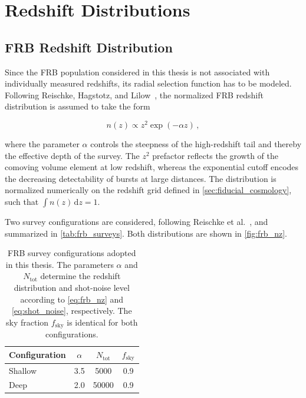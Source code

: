 \section{Redshift Distributions} \label{sec:redshift_distribution}

\subsection{FRB Redshift Distribution} \label{sec:frb_redshift_distribution}
Since the FRB population considered in this thesis is not associated with individually measured
redshifts, its radial selection function has to be modeled. Following
Reischke, Hagstotz, and Lilow~\cite{Reischke_2021}, the normalized FRB redshift distribution is
assumed to take the form

\begin{equation}\label{eq:frb_nz}
    n(z) \propto z^2 \exp(-\alpha z) \,,
\end{equation}

where the parameter $\alpha$ controls the steepness of the high-redshift tail and thereby the
effective depth of the survey. The $z^2$ prefactor reflects the growth of the comoving volume
element at low redshift, whereas the exponential cutoff encodes the decreasing detectability of
bursts at large distances. The distribution is normalized numerically on the redshift grid defined in
\autoref{sec:fiducial_cosmology}, such that $\int n(z)\,\mathrm{d}z = 1$. 

Two survey configurations are considered, following Reischke et al.~\cite{Reischke_2021}, and summarized in
\autoref{tab:frb_surveys}. Both distributions are shown in
\autoref{fig:frb_nz}.

\begin{table}
    \centering
    \caption{FRB survey configurations adopted in this thesis. 
    The
    parameters $\alpha$ and $N_{\mathrm{tot}}$ determine the redshift distribution and shot-noise
    level according to \autoref{eq:frb_nz} and \autoref{eq:shot_noise}, respectively.
    The sky fraction $f_{\mathrm{sky}}$ 
    is identical for both configurations.
    }
    \label{tab:frb_surveys}
    \begin{tabular}{
        l@{\hspace{1.0em}}
        S[table-format=1.1]
        @{\hspace{0.8em}}
        S[table-format=5.0]
        @{\hspace{0.8em}}
        S[table-format=1.1]
        }
        \toprule
        Configuration & {$\alpha$} & {$N_{\mathrm{tot}}$} & {$f_{\mathrm{sky}}$} \\
        \midrule
        Shallow & 3.5 & 5000  & 0.9 \\
        Deep    & 2.0 & 50000 & 0.9 \\
        \bottomrule
    \end{tabular}
\end{table}

